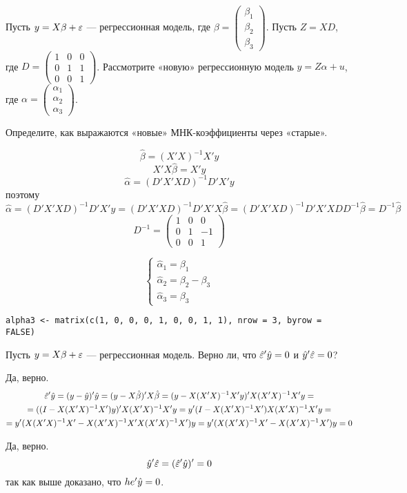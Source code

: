 \begin{problem}
Пусть $y = X\beta + \varepsilon$ — регрессионная модель, где $\beta = \begin{pmatrix} \beta_1 \\ \beta_2 \\ \beta_3 \end{pmatrix}$. Пусть $Z = XD$, где $D = \begin{pmatrix} 1 & 0 & 0 \\ 0 & 1 & 1 \\ 0 & 0 & 1 \end{pmatrix}$. Рассмотрите «новую» регрессионную модель $y = Z\alpha + u$, где $\alpha = \begin{pmatrix} \alpha_1 \\ \alpha_2 \\ \alpha_3 \end{pmatrix}$.

Определите, как выражаются «новые» МНК-коэффициенты через «старые».


\begin{sol}
\[\hat\beta=(X'X)^{-1}X'y\]
\[X'X\hat\beta=X'y\]
\[\hat\alpha=(D'X'XD)^{-1}D'X'y\]
поэтому
\[\hat\alpha=(D'X'XD)^{-1}D'X'y=(D'X'XD)^{-1}D'X'X\hat\beta=(D'X'XD)^{-1}D'X'XDD^{-1}\hat\beta=D^{-1}\hat\beta\]
\[D^{-1}=\left(\begin{array}{ccc}
1 & 0 & 0\\
0 & 1 & -1\\
0 & 0 & 1
\end{array}\right)\]

\[\begin{cases}
\hat\alpha_1=\beta_1\\
\hat\alpha_2=\beta_2-\beta_3\\
\hat\alpha_3=\beta_3
\end{cases}\]

\begin{verbatim}
alpha3 <- matrix(c(1, 0, 0, 0, 1, 0, 0, 1, 1), nrow = 3, byrow = FALSE)
\end{verbatim}



\end{sol}
\end{problem}



\begin{problem}
Пусть $y = X\beta + \varepsilon$ — регрессионная модель. Верно ли, что $\hat{\varepsilon}'\hat{y}=0$ и $\hat{y}'\hat{\varepsilon}=0$?

\begin{sol}
Да, верно.
\begin{multline*}
\hat{\varepsilon}'\hat{y}=(y-\hat{y})'\hat{y}=(y-X\hat\beta)'X\hat\beta=(y-X(X'X)^{-1}X'y)'X(X'X)^{-1}X'y=\\=
((I-X(X'X)^{-1}X')y)'X(X'X)^{-1}X'y=y'(I-X(X'X)^{-1}X')X(X'X)^{-1}X'y=\\
=y'(X(X'X)^{-1}X'-X(X'X)^{-1}X'X(X'X)^{-1}X')y=y'(X(X'X)^{-1}X'-X(X'X)^{-1}X')y=0
\end{multline*}

Да, верно.
\[\hat{y}'\hat{\varepsilon}=(\hat{\varepsilon}'\hat{y})'=0\]
так как выше доказано, что $he'\hat{y}=0$.
\end{sol}
\end{problem}


